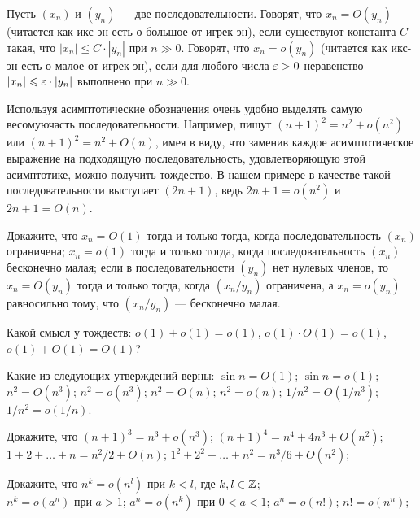 \documentclass[a4paper,12pt]{article}
\begin{document}

Пусть $(x_n)$ и $(y_n)$ --- две последовательности.
Говорят, что $x_n = O(y_n)$ (читается как  икс-эн есть о большое от игрек-эн),
если существуют константа $C$ такая, что $|x_n|\le C\cdot|y_n|$ при $n \gg 0$.
Говорят, что $x_n = o(y_n)$ (читается как  икс-эн есть о малое от игрек-эн),
если для любого числа $\varepsilon>0$ неравенство $|x_n|\leqslant \varepsilon\cdot|y_n|$ выполнено при $n\gg0$.

\small
Используя асимптотические обозначения очень удобно выделять самую  весомую часть последовательности.
Например, пишут $(n+1)^2 = n^2 + o(n^2)$ или $(n+1)^2 = n^2 + O(n)$, имея в виду,
что заменив каждое асимптотическое выражение на подходящую последовательность, удовлетворяющую этой асимптотике, можно получить тождество.
В нашем примере в качестве такой последовательности выступает $(2n+1)$, ведь $2n+1 = o(n^2)$ и $2n+1 = O(n)$.


Докажите, что
$x_n = O(1)$ тогда и только тогда, когда последовательность $(x_n)$ ограничена;
$x_n = o(1)$ тогда и только тогда, когда последовательность $(x_n)$ бесконечно малая;
если в последовательности $(y_n)$ нет нулевых членов, то $x_n=O(y_n)$ тогда и только тогда, когда $(x_n/y_n)$ ограничена,
а $x_n=o(y_n)$ равносильно тому, что $(x_n/y_n)$ --- бесконечно малая.


Какой смысл у тождеств: \quad $o(1) + o(1) = o(1)$, \quad $o(1)\cdot O(1) = o(1)$, \quad $o(1) + O(1) = O(1)$?

Какие из следующих утверждений верны:
$\sin n = O(1)$;\quad
$\sin n = o(1)$;
\smallskip%
\\
$n^2 = O(n^3)$;\quad
$n^2 = o(n^3)$;\quad
$n^2 = O(n)$;\quad
$n^2 = o(n)$;\quad
$1/n^2 = O(1/n^3)$;\quad
$1/n^2 = o(1/n)$.


Докажите, что
$(n+1)^3 = n^3 + o(n^3)$;
$(n+1)^4 = n^4 + 4 n^3 + O(n^2)$;
\\
$1 + 2 + \ldots + n = n^2/2 + O(n)$;
$1^2 + 2^2 + \ldots + n^2 = n^3/6 + O(n^2)$;



\vspace*{-2mm}

Докажите, что
$n^k = o(n^l)$ при $k < l$, где $k,l\in\mathbb{Z}$;
\\
$n^k = o(a^n)$ при $a > 1$;
$a^n = o(n^k)$ при $0 < a < 1$;
$a^n = o(n!)$;
$n! = o(n^n)$;
\vspace*{-2mm}
\end{document}
